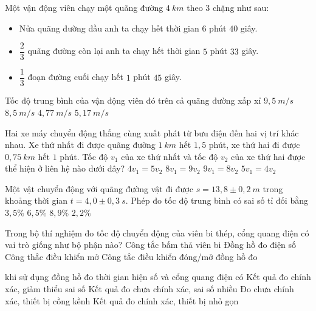 \begin{ex}%
Một vận động viên chạy một quãng đường $4\ km$ theo $3$ chặng như sau: 
\begin{itemize}
\item 	Nửa quãng đường đầu anh ta chạy hết thời gian $6$ phút $40$ giây.
\item $\dfrac{2}{3}$ quãng đường còn lại anh ta chạy hết thời gian $5$ phút $33$ giây. 
\item $\dfrac{1}{3}$ đoạn đường cuối chạy hết $1$ phút $45$ giây.
\end{itemize}
Tốc độ trung bình của vận động viên đó trên cả quãng đường xấp xỉ
\choice
{$9,5\ m/s$}
{$8,5\ m/s$}
{\True $4,77\ m/s$}
{$5,17\ m/s$}
\loigiai{

}
\end{ex}
\begin{ex}%
Hai xe máy chuyển động thẳng cùng xuất phát từ bưu điện đến hai vị trí khác nhau. Xe thứ nhất đi được quãng đường $1\ km$ hết $1,5$ phút, xe thứ hai đi được $0,75\ km$ hết $1$ phút. Tốc độ $v_1$ của xe thứ nhất và tốc độ $v_2$ của xe thứ hai được thể hiện ở liên hệ nào dưới đây?
\choice
{$4 v_1=5 v_2$}
{$8 v_1=9 v_2$}
{\True $9 v_1=8 v_2$}
{$5 v_1=4 v_2$}
\loigiai{
}
\end{ex}
\begin{ex}
Một vật chuyển động với quãng đường vật đi được $s=13,8 \pm 0,2\ m$ trong khoảng thời gian $t=4,0 \pm 0,3\ s$. Phép đo tốc độ trung bình có sai số tỉ đối bằng
\choice
{$3,5\%$}
{$6,5\%$}
{\True $8,9\%$}
{$2,2\%$}
\end{ex}
\begin{ex}%
Trong bộ thí nghiệm đo tốc độ chuyển động của viên bi thép, cổng quang điện có vai trò giống như bộ phận nào?
\choice
{Công tắc bấm thả viên bi}
{Đồng hồ đo điện số}
{Công thắc điều khiển mở}
{\True Công tắc điều khiển đóng/mở đồng hồ đo}

\loigiai{
}
 \end{ex}
\begin{ex}%
khi sử dụng đồng hồ đo thời gian hiện số và cổng quang điện có
\choice
{\True Kết quả đo chính xác, giảm thiểu sai số}
{Kết quả đo chưa chính xác, sai số nhiều}
{Đo chưa chính xác, thiết bị cồng kềnh}
{Kết quả đo chính xác, thiết bị nhỏ gọn}

\loigiai{
}
 \end{ex}
